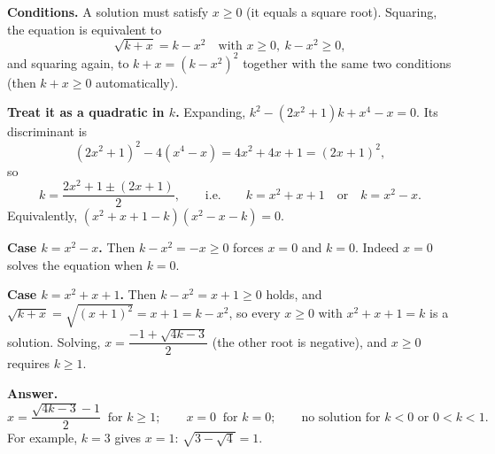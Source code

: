\textbf{Conditions.} A solution must satisfy $x\ge0$ (it equals a square root). Squaring, the equation is equivalent to
\[
\sqrt{k+x}=k-x^2\quad\text{with }x\ge0,\ k-x^2\ge0 ,
\]
and squaring again, to $k+x=\left(k-x^2\right)^2$ together with the same two conditions (then $k+x\ge0$ automatically).

\textbf{Treat it as a quadratic in $k$.} Expanding, $k^2-\left(2x^2+1\right)k+x^4-x=0$. Its discriminant is
\[
\left(2x^2+1\right)^2-4\left(x^4-x\right)=4x^2+4x+1=(2x+1)^2,
\]
so
\[
k=\dfrac{2x^2+1\pm(2x+1)}{2},\qquad\text{i.e.}\qquad k=x^2+x+1\quad\text{or}\quad k=x^2-x .
\]
Equivalently, $\left(x^2+x+1-k\right)\left(x^2-x-k\right)=0$.

\textbf{Case $k=x^2-x$.} Then $k-x^2=-x\ge0$ forces $x=0$ and $k=0$. Indeed $x=0$ solves the equation when $k=0$.

\textbf{Case $k=x^2+x+1$.} Then $k-x^2=x+1\ge0$ holds, and $\sqrt{k+x}=\sqrt{(x+1)^2}=x+1=k-x^2$, so every $x\ge0$ with $x^2+x+1=k$ is a solution. Solving, $x=\dfrac{-1+\sqrt{4k-3}}{2}$ (the other root is negative), and $x\ge0$ requires $k\ge1$.

\textbf{Answer.}
\[
\boxed{x=\dfrac{\sqrt{4k-3}-1}{2}\ \text{ for }k\ge1;\qquad x=0\ \text{ for }k=0;\qquad\text{no solution for }k<0\text{ or }0<k<1.}
\]
For example, $k=3$ gives $x=1$: $\sqrt{3-\sqrt4}=1$.
